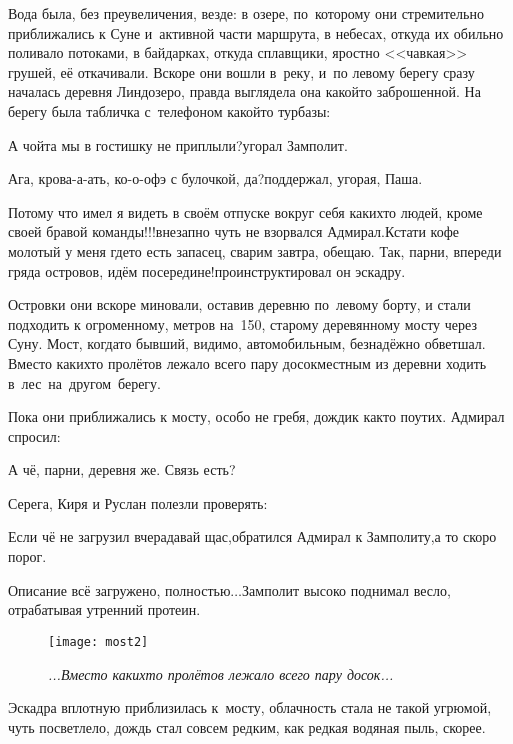 Вода была, без преувеличения, везде: в озере, по~которому они стремительно приближались к Суне и~активной части маршрута, в небесах, откуда их обильно поливало потоками, в байдарках, откуда сплавщики, яростно <<чавкая>> грушей, её откачивали. Вскоре они вошли в~реку, и~по левому берегу сразу началась деревня Линдозеро, правда выглядела она какой\sdash то заброшенной. На берегу была табличка с~телефоном какой\sdash то турбазы:

\diagdash А чойта мы в гостишку не приплыли?\mdash угорал Замполит.

\diagdash Ага, крова-а-ать, ко-о-офэ с булочкой, да?\mdash поддержал, угорая, Паша.

\diagdash Потому что имел я видеть в своём отпуске вокруг себя каких\sdash то людей, кроме своей бравой команды!!!\mdash внезапно чуть не взорвался Адмирал.\mdash Кстати кофе молотый у меня где\sdash то есть запасец, сварим завтра, обещаю. Так, парни, впереди гряда островов, идём посередине!\mdash проинструктировал он эскадру.

Островки они вскоре миновали, оставив деревню по~левому борту, и стали подходить к огроменному, метров на~150, старому деревянному мосту через Суну. Мост, когда\sdash то бывший, видимо, автомобильным, безнадёжно обветшал. Вместо каких\sdash то пролётов лежало всего пару досок\mdash местным из деревни ходить в~лес~на~другом~берегу.

Пока они приближались к мосту, особо не гребя, дождик как\sdash то поутих. Адмирал спросил:

\diagdash А чё, парни, деревня же. Связь есть?

Серега, Киря и Руслан полезли проверять:

\diagdash Если чё не загрузил вчера\mdash давай щас,\mdash обратился Адмирал к Замполиту,\mdash а то скоро порог.

\diagdash Описание всё загружено, полностью$\ldots$\mdash Замполит высоко поднимал весло, отрабатывая утренний протеин.

{
\setlength{\belowcaptionskip}{0.1mm}
\begin{figure}[h]
	\centering
	\texttt{[image: most2]}
	\caption{\small\textit{...Вместо каких\sdash то пролётов лежало всего пару досок...}}
\end{figure}

Эскадра вплотную приблизилась к~мосту, облачность стала не такой угрюмой, чуть посветлело, дождь стал совсем редким, как редкая водяная пыль, скорее. 
}

